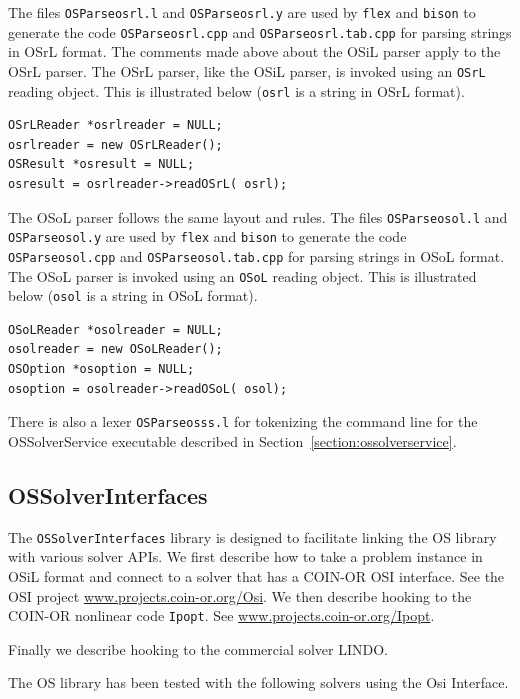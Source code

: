 \documentclass[11pt]{article}
\renewcommand{\_}{{\char"5F}}
\renewcommand{\{}{{\char"7B}}
\renewcommand{\}}{{\char"7D}}
\renewcommand{\^}{{\char"0D}}
\renewcommand{\'}{{\char"0D}}
\newif\ifknitro \knitrofalse    %
\begin{document}
\begin{enumerate}[Step 1:]
The files {\tt OSParseosrl.l} and {\tt OSParseosrl.y} are used by {\tt flex} and {\tt bison} to  generate the code 
{\tt OSParseosrl.cpp} and {\tt OSParseosrl.tab.cpp} for parsing strings in OSrL format. The comments made above about the 
OSiL parser apply to the OSrL parser. The OSrL parser, like the OSiL parser, is invoked using an {\tt OSrL} reading object.
This is illustrated below ({\tt osrl} is a string in OSrL format).
\begin{verbatim}
OSrLReader *osrlreader = NULL;
osrlreader = new OSrLReader();
OSResult *osresult = NULL;
osresult = osrlreader->readOSrL( osrl);
\end{verbatim}

The OSoL parser follows the same layout and rules.
The files {\tt OSParseosol.l} and {\tt OSParseosol.y} are used by {\tt flex} and {\tt bison} to  generate the code 
{\tt OSParseosol.cpp} and {\tt OSParseosol.tab.cpp} for parsing strings in OSoL format. The OSoL parser
is invoked using an {\tt OSoL} reading object.
This is illustrated below ({\tt osol} is a string in OSoL format).
\begin{verbatim}
OSoLReader *osolreader = NULL;
osolreader = new OSoLReader();
OSOption *osoption = NULL;
osoption = osolreader->readOSoL( osol);
\end{verbatim}


There is also a lexer {\tt OSParseosss.l} for tokenizing the command line for the OSSolverService executable 
described in Section~\ref{section:ossolverservice}.



\subsection{OSSolverInterfaces}\label{section:ossolverinterfaces}


The {\tt OSSolverInterfaces} library is designed to facilitate linking the OS library with various solver APIs.
We first describe how to take a problem instance in OSiL format and connect to a solver 
that has a COIN-OR OSI interface. See the OSI project \url{www.projects.coin-or.org/Osi}.
We then describe hooking to the COIN-OR nonlinear code {\tt Ipopt}. 
See \url{www.projects.coin-or.org/Ipopt}.
\ifknitro
Finally we describe hooking to two commercial solvers Knitro\index{Knitro} and LINDO\index{LINDO}.
\else
Finally we describe hooking to the commercial solver LINDO.
\fi
The OS library has been tested with the following solvers using the Osi Interface.


\end{enumerate}
\end{document}
